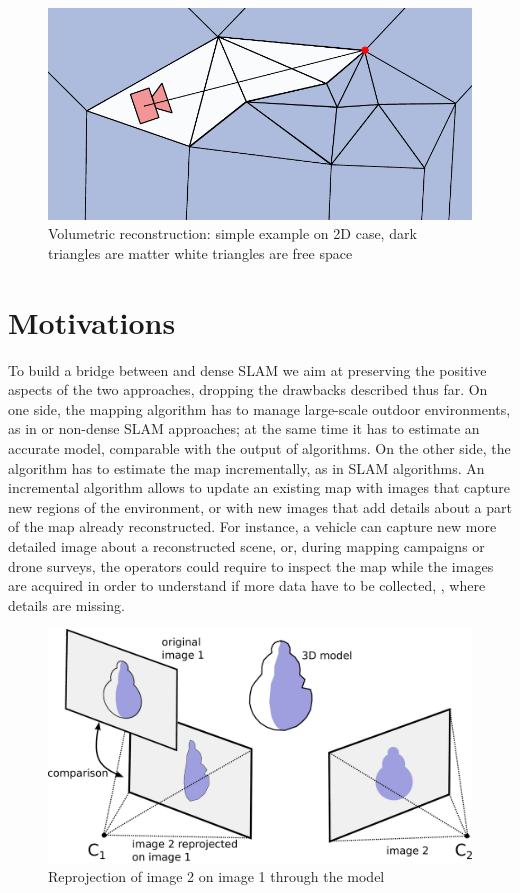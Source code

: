 \begin{figure}[tp]
 \centering
 \includegraphics[width=0.85\columnwidth]{./img/spacecarv}
 \caption{Volumetric reconstruction: simple example on 2D case, dark triangles are matter white triangles are free space}
 \label{fig:Volumetricc}
\end{figure}


\section{Motivations}
To build a bridge between \mvs and dense SLAM we aim at preserving the positive aspects of the two approaches, dropping the drawbacks described thus far. 
On one side, the mapping algorithm has to manage large-scale outdoor environments, as in \mvs or non-dense SLAM approaches; at the same time it has to estimate an accurate model, comparable with the output of \mvs algorithms.
On the other  side, the algorithm has to estimate the map incrementally, as in SLAM algorithms.
An incremental algorithm allows to update an existing map with images that capture new regions of the environment, or with new images that add details about a part of the map already reconstructed.
For instance, a vehicle can capture new more detailed image about a reconstructed scene, or, during mapping campaigns or drone surveys, the operators could require to inspect the map while the images are  acquired in order to understand if more data have to be collected, \eg, where details are missing.


\begin{figure}[tp]
 \centering
 \includegraphics[width=0.925\columnwidth]{./img/reprojOr}
 \caption{Reprojection of image 2 on  image 1 through the model}
 \label{fig:reproj}
\end{figure}


